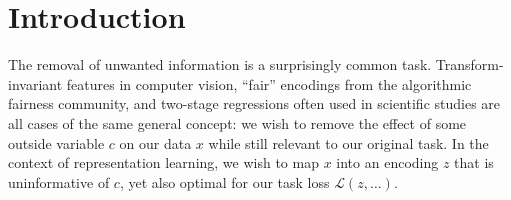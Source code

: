 
\section{Introduction}
\label{sec:intro}

The removal of unwanted information is a surprisingly common task. Transform-invariant features in computer vision, ``fair'' encodings from the algorithmic fairness community, and two-stage regressions often used in scientific studies are all cases of the same general concept:
we wish to remove the effect of some outside variable $c$ on our data $x$ while still relevant to our original task. In the context of representation learning, we wish to map $x$ into an encoding $z$ that is uninformative of $c$, yet also optimal for our task loss $\mathcal{L}(z,\dots)$. %



